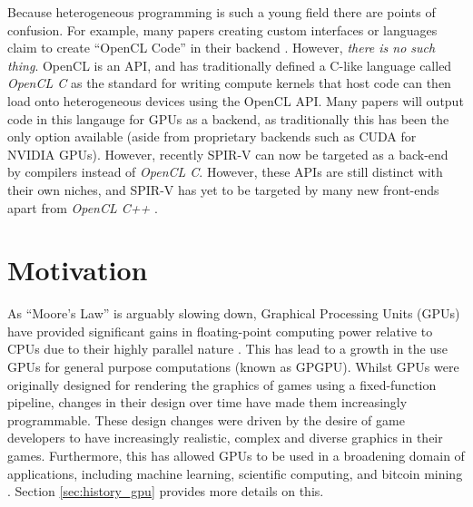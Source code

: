 \documentclass[a4paper,12pt,twoside,openright]{report}
\begin{document}
Because heterogeneous programming is such a young field there are points of
confusion. For example, many papers creating custom interfaces or languages
claim to create ``OpenCL Code'' in their backend \cite{JITGPU} \cite{Lime2012}.
However, \textit{there is no such thing}. OpenCL is an API, and has
traditionally defined a C-like language called \textit{OpenCL C} as the
standard for writing compute kernels that host code can then load onto
heterogeneous devices using the OpenCL API. Many papers will output code in
this langauge for GPUs as a backend, as traditionally this has been the only
option available (aside from proprietary backends such as CUDA for NVIDIA
GPUs). However, recently SPIR-V can now be targeted as a back-end by compilers
instead of \textit{OpenCL C}. However, these APIs are still distinct with their
own niches, and SPIR-V has yet to be targeted by many new front-ends apart from
\textit{OpenCL C++} \cite{OpenCLCPPWhitePaper}.

\section{Motivation}


As ``Moore's Law'' is arguably slowing down, Graphical Processing Units (GPUs)
have provided significant gains in floating-point computing power relative to
CPUs due to their highly parallel nature \cite{MooreLawSlowdown}
\cite{CPUGPUOverTime}. This has lead to a growth in the use GPUs for general
purpose computations (known as GPGPU). Whilst GPUs were originally designed for
rendering the graphics of games using a fixed-function pipeline, changes in
their design over time have made them increasingly programmable. These design
changes were driven by the desire of game developers to have increasingly
realistic, complex and diverse graphics in their games. Furthermore, this has
allowed GPUs to be used in a broadening domain of applications, including
machine learning, scientific computing, and bitcoin mining \cite{GPUCrypto}
\cite{GPUScientificComputing} \cite{GPUAI}. Section \ref{sec:history_gpu}
provides more details on this.
\end{document}
